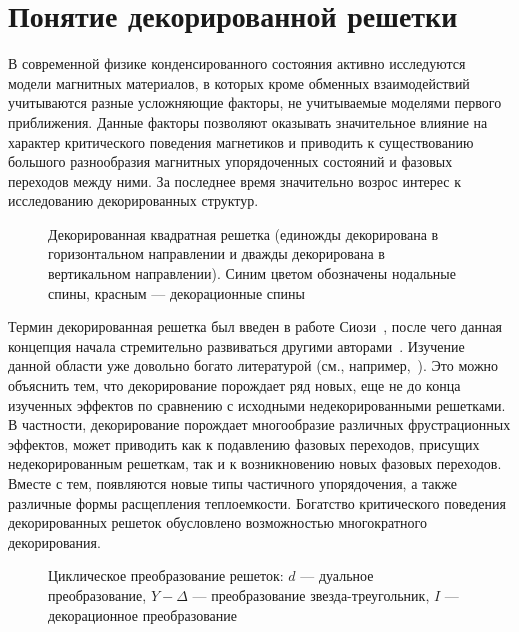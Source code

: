 \section{Понятие декорированной решетки} 

В современной физике конденсированного состояния активно исследуются модели магнитных материалов, в которых кроме обменных взаимодействий учитываются разные усложняющие факторы, не учитываемые моделями первого приближения. Данные факторы позволяют оказывать значительное влияние на характер критического поведения магнетиков и приводить к существованию большого разнообразия магнитных упорядоченных состояний и фазовых переходов между ними. За последнее время значительно возрос интерес к исследованию декорированных структур.

\begin{figure}[h]
	\caption{Декорированная квадратная решетка (единожды декорирована в горизонтальном направлении и дважды декорирована в вертикальном направлении). Синим цветом обозначены нодальные спины, красным --- декорационные спины}
	\label{decorSquare}
\end{figure}

Термин \guillemotleft декорированная решетка\guillemotright \hspace{1pt} был введен в работе Сиози~\cite{siozi1951}, после чего данная концепция начала стремительно развиваться другими авторами~\cite{siozi_domb1972, fisher1958}. Изучение данной области уже довольно богато литературой (см., например,~\cite{jaščur2016, strečka2019_1, strečka2019_2, gálisová2018, cenčariková2016, stubňa2017, mutalamov2020}). Это можно объяснить тем, что декорирование порождает ряд новых, еще не до конца изученных эффектов по сравнению с исходными недекорированными решетками. В частности, декорирование порождает многообразие различных фрустрационных эффектов, может приводить как к подавлению фазовых переходов, присущих недекорированным решеткам, так и к возникновению новых фазовых переходов. Вместе с тем, появляются новые типы частичного упорядочения, а также различные формы расщепления теплоемкости. Богатство критического поведения декорированных решеток обусловлено возможностью многократного декорирования.

\begin{figure}[h]
	\caption{Циклическое преобразование решеток: $d$ --- дуальное преобразование, $Y - \Delta$ --- преобразование \guillemotleft звезда-треугольник\guillemotright \hspace{1pt}, $I$ --- декорационное преобразование~\cite{siozi_domb1972}}
	\label{transformCycle}
\end{figure}

